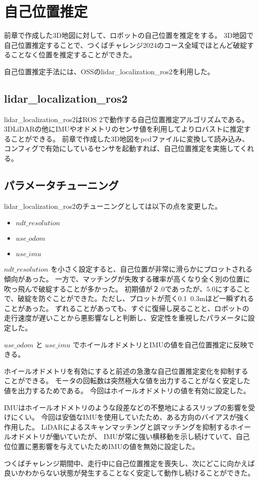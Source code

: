 \section{自己位置推定}
前章で作成した3D地図に対して、ロボットの自己位置を推定をする。
3D地図で自己位置推定することで、つくばチャレンジ2024のコース全域でほとんど破綻することなく位置を推定することができた。

自己位置推定手法には、OSSのlidar\_localization\_ros2\cite{Localization}を利用した。

\subsection{lidar\_localization\_ros2}
lidar\_localization\_ros2はROS 2で動作する自己位置推定アルゴリズムである。
3DLiDARの他にIMUやオドメトリのセンサ値を利用してよりロバストに推定することができる。
前章で作成した3D地図をpcdファイルに変換して読み込み、コンフィグで有効にしているセンサを起動すれば、自己位置推定を実施してくれる。

\subsection{パラメータチューニング}
lidar\_localization\_ros2のチューニングとしては以下の点を変更した。
\begin{itemize}
    \item $ndt\_resolution$
    \item $use\_odom$
    \item $use\_imu$
\end{itemize}

$ndt\_resolution$ を小さく設定すると、自己位置が非常に滑らかにプロットされる傾向があった。
一方で、マッチングが失敗する確率が高くなり全く別の位置に吹っ飛んで破綻することが多かった。
初期値が$２.0$であったが、$5.0$にすることで、破綻を防ぐことができた。ただし、プロットが荒く0.1~0.3mほど一瞬ずれることがあった。
ずれることがあっても、すぐに復帰し戻ることと、ロボットの走行速度が遅いことから悪影響なしと判断し、安定性を重視したパラメータに設定した。

$use\_odom$ と $use\_imu$ でホイールオドメトリとIMUの値を自己位置推定に反映できる。

ホイールオドメトリを有効にすると前述の急激な自己位置推定変化を抑制することができる。
モータの回転数は突然極大な値を出力することがなく安定した値を出力するためである。
今回はホイールオドメトリの値を有効に設定した。

IMUはホイールオドメトリのような段差などの不整地によるスリップの影響を受けにくい。
今回は安価なIMUを使用していたため、ある方向のバイアスが強く作用した。
LiDARによるスキャンマッチングと誤マッチングを抑制するホイールオドメトリが働いていたが、
IMUが常に強い横移動を示し続けていて、自己位位置に悪影響を与えていたためIMUの値を無効に設定した。

つくばチャレンジ期間中、走行中に自己位置推定を喪失し、次にどこに向かえば良いかわからない状態が発生することなく安定して動作し続けることができた。